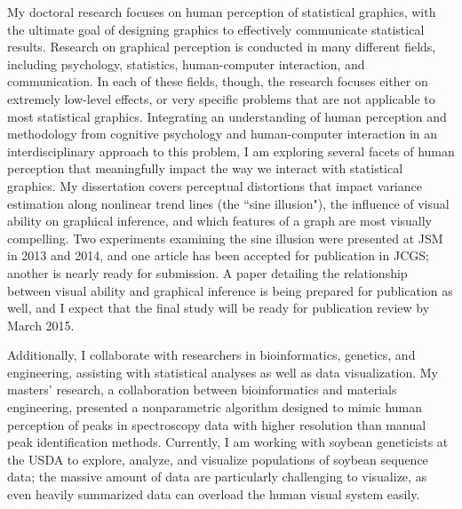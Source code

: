 \documentclass[11pt,letterpaper,sans,unicode]{moderncv}        %
\begin{document}
My doctoral research focuses on human perception of statistical graphics, with the ultimate goal of designing graphics to effectively communicate statistical results. Research on graphical perception is conducted in many different fields, including psychology, statistics, human-computer interaction, and communication. In each of these fields, though, the research focuses either on extremely low-level effects, or very specific problems that are not applicable to most statistical graphics. Integrating an understanding of human perception and methodology from cognitive psychology and human-computer interaction in an interdisciplinary approach to this problem, I am exploring several facets of human perception that meaningfully impact the way we interact with statistical graphics. My dissertation covers perceptual distortions that impact variance estimation along nonlinear trend lines (the ``sine illusion"), the influence of visual ability on graphical inference, and which features of a graph are most visually compelling. Two experiments examining the sine illusion were presented at JSM in 2013 and 2014, and one article has been accepted for publication in JCGS; another is nearly ready for submission. A paper detailing the relationship between visual ability and graphical inference is being prepared for publication as well, and I expect that the final study will be ready for publication review by March 2015.

Additionally, I collaborate with researchers in bioinformatics, genetics, and engineering, assisting with statistical analyses as well as data visualization. My masters' research, a collaboration between bioinformatics and materials engineering, presented a nonparametric algorithm designed to mimic human perception of peaks in spectroscopy data with higher resolution than manual peak identification methods. Currently, I am working with soybean geneticists at the USDA to explore, analyze, and visualize populations of soybean sequence data; the massive amount of data are particularly challenging to visualize, as even heavily summarized data can overload the human visual system easily.
\end{document}
